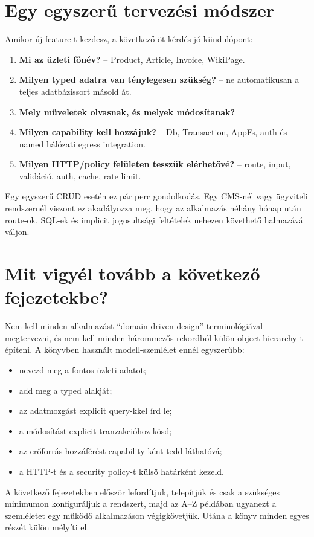\section{Egy egyszerű tervezési módszer}

Amikor új feature-t kezdesz, a következő öt kérdés jó kiindulópont:

\begin{enumerate}
  \item \textbf{Mi az üzleti főnév?} -- Product, Article, Invoice, WikiPage.
  \item \textbf{Milyen typed adatra van ténylegesen szükség?} -- ne automatikusan a teljes adatbázissort másold át.
  \item \textbf{Mely műveletek olvasnak, és melyek módosítanak?}
  \item \textbf{Milyen capability kell hozzájuk?} -- Db, Transaction, AppFs, auth és named hálózati egress integration.
  \item \textbf{Milyen HTTP/policy felületen tesszük elérhetővé?} -- route, input, validáció, auth, cache, rate limit.
\end{enumerate}

Egy egyszerű CRUD esetén ez pár perc gondolkodás. Egy CMS-nél vagy ügyviteli rendszernél viszont ez akadályozza meg, hogy az alkalmazás néhány hónap után route-ok, SQL-ek és implicit jogosultsági feltételek nehezen követhető halmazává váljon.

\section{Mit vigyél tovább a következő fejezetekbe?}

Nem kell minden alkalmazást ``domain-driven design'' terminológiával megtervezni, és nem kell minden hárommezős rekordból külön object hierarchy-t építeni. A könyvben használt modell-szemlélet ennél egyszerűbb:

\begin{itemize}
  \item nevezd meg a fontos üzleti adatot;
  \item add meg a typed alakját;
  \item az adatmozgást explicit query-kkel írd le;
  \item a módosítást explicit tranzakcióhoz kösd;
  \item az erőforrás-hozzáférést capability-ként tedd láthatóvá;
  \item a HTTP-t és a security policy-t külső határként kezeld.
\end{itemize}

A következő fejezetekben először lefordítjuk, telepítjük és csak a szükséges minimumon konfiguráljuk a rendszert, majd az A--Z példában ugyanezt a szemléletet egy működő  alkalmazáson végigkövetjük. Utána a könyv minden egyes részét külön mélyíti el.
